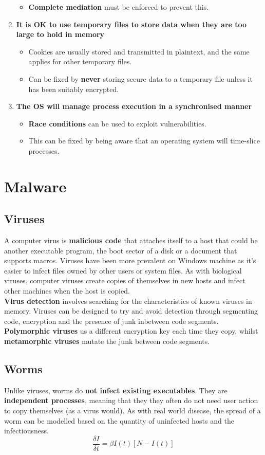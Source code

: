 \documentclass{article}
\newcommand{\np}{\vspace{8pt} \\}
\begin{document}
\begin{enumerate}
\begin{itemize}
		\item \textbf{Complete mediation} must be enforced to prevent this.
	\end{itemize}
	\item \textbf{It is OK to use temporary files to store data when they are too large to hold in memory}
	\begin{itemize}
		\item Cookies are usually stored and transmitted in plaintext, and the same applies for other temporary files.
		\item Can be fixed by \textbf{never} storing secure data to a temporary file unless it has been suitably encrypted.
	\end{itemize}
	\item \textbf{The OS will manage process execution in a synchronised manner}
	\begin{itemize}
		\item \textbf{Race conditions} can be used to exploit vulnerabilities.
		\item This can be fixed by being aware that an operating system will time-slice processes.
	\end{itemize}
\end{enumerate}

\section{Malware}

\subsection{Viruses}
A computer virus is \textbf{malicious code} that attaches itself to a host that could be another executable program, the boot sector of a disk or a document that supports macros. Viruses have been more prevalent on Windows machine as it's easier to infect files owned by other users or system files. As with biological viruses, computer viruses create copies of themselves in new hosts and infect other machines when the host is copied. \np
\textbf{Virus detection} involves searching for the characteristics of known viruses in memory. Viruses can be designed to try and avoid detection through segmenting code, encryption and the presence of junk inbetween code segments. \textbf{Polymorphic viruses} us a different encryption key each time they copy, whilst \textbf{metamorphic viruses} mutate the junk between code segments.

\subsection{Worms}
Unlike viruses, worms do \textbf{not infect existing executables}. They are \textbf{independent processes}, meaning that they they often do not need user action to copy themselves (as a virus would). As with real world disease, the spread of a worm can be modelled based on the quantity of uninfected hosts and the infectiousness.
\[
	\frac{\delta I}{\delta t} = \beta I(t) [N - I(t)]
\]
\end{document}

